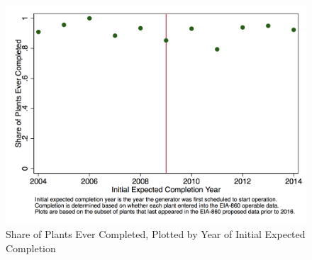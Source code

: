 \documentclass[12pt]{article}
\begin{document}

\begin{figure}[h] \centering
\caption{Share of Plants Ever Completed, Plotted by Year of Initial Expected Completion\label{fig:proposed_ever_completed}}
\includegraphics[width=0.75\linewidth]{../output/figures/proposal_data_ever_completed.png}
\end{figure}
\end{document}
